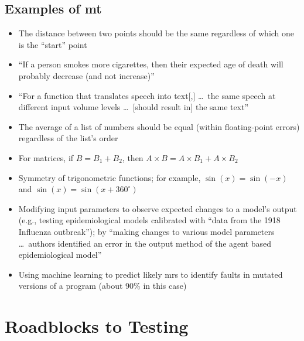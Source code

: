 \subsection[Examples of MT]{Examples of \acs{mt}}
\begin{itemize}
      \item The distance between two points should be the same regardless of
            which one is the ``start'' point \citep[p.~22]{IEEE2021}
      \item ``If a person smokes more cigarettes, then their expected age of
            death will probably decrease (and not increase)''
            \citep[p.~22]{IEEE2021}
      \item ``For a function that translates speech into text[,] \dots\ the
            same speech at different input volume levels \dots\ [should result
            in] the same text'' \citep[p.~22]{IEEE2021}
      \item The average of a list of numbers should be equal (within
            floating-point errors) regardless of the list's order
            \citep[p.~67]{KanewalaAndYuehChen2019}
      \item For matrices, if $B = B_1 + B_2$, then $A \times B = A \times B_1
                  + A \times B_2$ \citep[pp.~68-69]{KanewalaAndYuehChen2019}
      \item Symmetry of trigonometric functions; for example, $\sin(x) = \sin(-x)$
            and $\sin(x) = \sin(x + 360^{\circ})$ \citep[p.~70]{KanewalaAndYuehChen2019}
      \item Modifying input parameters to observe expected changes to a model's
            output (e.g., testing epidemiological models calibrated with
            ``data from the 1918 Influenza outbreak''); by ``making changes to
            various model parameters \dots\ authors identified an error in the
            output method of the agent based epidemiological model''
            \citep[p.~70]{KanewalaAndYuehChen2019}
      \item Using machine learning to predict likely \acsp{mr} to identify
            faults in mutated versions of a program (about 90\% in this case)
            \citep[p.~71]{KanewalaAndYuehChen2019}
\end{itemize}

\section{Roadblocks to Testing}

